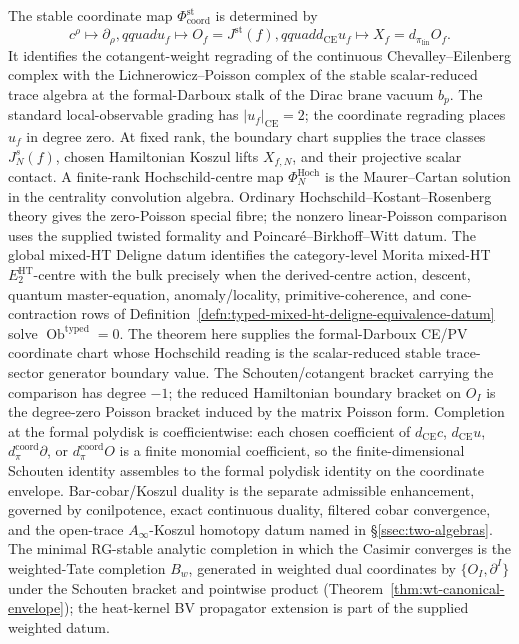 \documentclass[11pt]{memoir}
\begin{document}
The stable coordinate map \(\Phi_{\mathrm{coord}}^{\mathrm{st}}\) is
determined by
\[
  c^\rho\longmapsto\partial_\rho,qquad
  u_f\longmapsto O_f=J^{\mathrm{st}}(f),qquad
  d_{\mathrm{CE}}u_f\longmapsto X_f=d_{\pi_{\mathrm{lin}}}O_f.
\]
It identifies the cotangent-weight regrading of the continuous
Chevalley--Eilenberg complex with the Lichnerowicz--Poisson complex of
the stable scalar-reduced trace algebra at the formal-Darboux stalk of
the Dirac brane vacuum \(b_p\).  The standard local-observable grading
has \(|u_f|_{\mathrm{CE}}=2\); the coordinate regrading places \(u_f\)
in degree zero.  At fixed rank, the boundary chart supplies the trace
classes \(J_N^s(f)\), chosen Hamiltonian Koszul lifts \(X_{f,N}\), and
their projective scalar contact.  A finite-rank Hochschild-centre map
\(\Phi_N^{\mathrm{Hoch}}\) is the Maurer--Cartan solution in the
centrality convolution algebra.  Ordinary Hochschild--Kostant--Rosenberg
theory gives the zero-Poisson special fibre; the nonzero linear-Poisson
comparison uses the supplied twisted formality and
Poincar\'e--Birkhoff--Witt datum.  The
global mixed-HT Deligne datum identifies the category-level Morita
mixed-HT \(E_2^{\mathrm{HT}}\)-centre with the bulk precisely when the
derived-centre action, descent, quantum master-equation,
anomaly/locality, primitive-coherence, and cone-contraction rows of
Definition~\ref{defn:typed-mixed-ht-deligne-equivalence-datum} solve
\(\operatorname{Ob}^{\mathrm{typed}}=0\).  The theorem here supplies the formal-Darboux CE/PV
coordinate chart whose Hochschild reading is the scalar-reduced stable
trace-sector generator boundary value.  The
Schouten/cotangent bracket carrying the comparison has degree \(-1\);
the reduced Hamiltonian boundary bracket on \(O_I\) is the degree-zero
Poisson bracket induced by the matrix Poisson form.  Completion at the
  formal polydisk is coefficientwise: each chosen coefficient of
  \(d_{\mathrm{CE}}c\), \(d_{\mathrm{CE}}u\),
  \(d_\pi^{\mathrm{coord}}\partial\), or \(d_\pi^{\mathrm{coord}}O\) is a
  finite monomial coefficient, so the finite-dimensional Schouten identity
assembles to the formal polydisk identity on the coordinate envelope.
Bar-cobar/Koszul duality is the separate admissible enhancement,
governed by conilpotence, exact continuous duality, filtered cobar
convergence, and the open-trace \(A_\infty\)-Koszul homotopy datum
named in \S\ref{ssec:two-algebras}.  The minimal RG-stable analytic
completion in which the Casimir converges is the weighted-Tate
completion \(B_w\), generated in weighted dual coordinates by
\(\{O_I,\partial^I\}\) under the Schouten bracket and pointwise product
(Theorem~\ref{thm:wt-canonical-envelope}); the heat-kernel BV
propagator extension is part of the supplied weighted datum.
\end{document}
